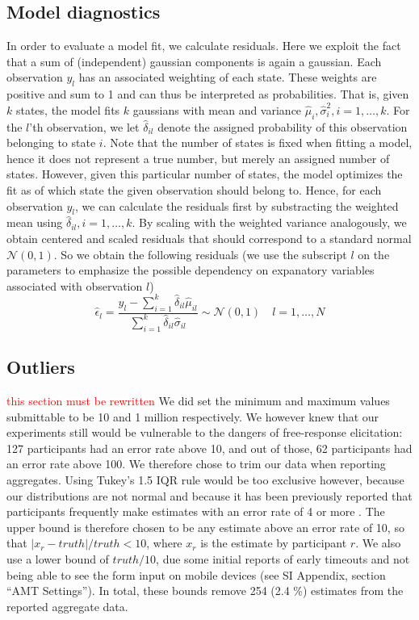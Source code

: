 \documentclass[9pt,twocolumn,twoside,lineno]{pnas-new}
\begin{document}
{ \subsection*{Model diagnostics}
In order to evaluate a model fit, we calculate residuals. Here we exploit the fact that a sum of (independent) gaussian components is again a gaussian. Each observation $y_l$ has an associated weighting of each state. These weights are positive and sum to 1 and can thus be interpreted as probabilities. That is, given $k$ states, the model fits $k$ gaussians with mean and variance $\hat{\mu}_i, \hat{\sigma}_i^2, i=1,\dots, k$. For the $l$'th observation, we let $\hat{\delta}_{il}$ denote the assigned probability of this observation belonging to state $i$. Note that the number of states is fixed when fitting a model, hence it does not represent a true number, but merely an assigned number of states. However, given this particular number of states, the model optimizes the fit as of which state the given observation should belong to.
Hence, for each observation $y_l$, we can calculate the residuals first by substracting the weighted mean using $\hat{\delta}_{il}, i=1,\dots,k$. By scaling with the weighted variance analogously, we obtain centered and scaled residuals that should correspond to a standard normal $\mathcal{N}(0,1)$. So we obtain the following residuals (we use the subscript $l$ on the parameters to emphasize the possible dependency on expanatory variables associated with observation $l$)
$$
  \hat{\epsilon}_l = \frac{y_l-\sum_{i=1}^k\hat{\delta}_{il}\hat{\mu}_{il} }{\sum_{i=1}^k\hat{\delta}_{il} \hat{\sigma}_{il}}\sim\mathcal{N}(0,1)\quad l=1,\dots,N
$$
\subsection*{Outliers} \textcolor{red}{this section must be rewritten} We did set the minimum and maximum values submittable to be 10 and 1 million respectively. We however knew that our experiments still would be vulnerable to the dangers of free-response elicitation: 127 participants had an error rate above 10, and out of those, 62 participants had an error rate above 100. We therefore chose to trim our data when reporting aggregates. Using Tukey’s 1.5 IQR rule \cite{tukey1977exploratory} would be too exclusive however, because our distributions are not normal and because it has been previously reported that participants frequently make estimates with an error rate of 4 or more \cite{izard2008calibrating, kao2018counteracting, indow1977scaling}. The upper bound is therefore chosen to be any estimate above an error rate of 10, so that $|x_r-truth|/truth <10$, where $x_r$ is the estimate by participant $r$. We also use a lower bound of $truth/10$, due some initial reports of early timeouts and not being able to see the form input on mobile devices (see SI Appendix, section “AMT Settings”). In total, these bounds remove 254 (2.4 \%) estimates from the reported aggregate data. 
}
\showmatmethods{} %
\end{document}
